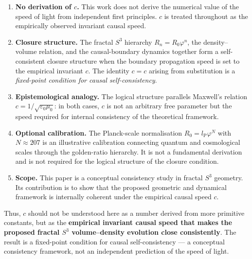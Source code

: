 \documentclass[11pt,a4paper]{article}
\newcommand{\lP}{l_{\mathrm{P}}}
\newcommand{\ph}{\varphi}
\begin{document}
\begin{enumerate}[leftmargin=2em, itemsep=5pt]

  \item \textbf{No derivation of $c$.}\;
  This work does not derive the numerical value of the speed of light from
  independent first principles. $c$ is treated throughout as the empirically
  observed invariant causal speed.

  \item \textbf{Closure structure.}\;
  The fractal $S^3$ hierarchy $R_n = R_0\ph^n$, the density--volume relation, and
  the causal-boundary dynamics together form a self-consistent closure structure
  when the boundary propagation speed is set to the empirical invariant $c$. The
  identity $c = c$ arising from substitution is a \emph{fixed-point condition for
  causal self-consistency}.

  \item \textbf{Epistemological analogy.}\;
  The logical structure parallels Maxwell's relation $c = 1/\!\sqrt{\varepsilon_0\mu_0}$:
  in both cases, $c$ is not an arbitrary free parameter but the speed required for
  internal consistency of the theoretical framework.

  \item \textbf{Optional calibration.}\;
  The Planck-scale normalisation $R_0 = \lP\ph^N$ with $N\approx207$ is an
  illustrative calibration connecting quantum and cosmological scales through the
  golden-ratio hierarchy. It is not a fundamental derivation and is not required for
  the logical structure of the closure condition.

  \item \textbf{Scope.}\;
  This paper is a conceptual consistency study in fractal $S^3$ geometry.
  Its contribution is to show that the proposed geometric and dynamical
  framework is internally coherent under the empirical causal speed $c$.

\end{enumerate}

\medskip
\begin{closurebox}
Thus, $c$ should not be understood here as a number derived from more primitive
constants, but as the \textbf{empirical invariant causal speed that makes the
proposed fractal $S^3$ volume--density evolution close consistently}. The result is
a fixed-point condition for causal self-consistency — a conceptual consistency
framework, not an independent prediction of the speed of light.
\end{closurebox}
\end{document}

